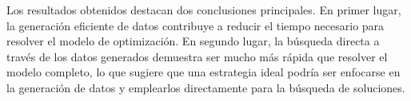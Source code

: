 \documentclass[12pt]{report}
\begin{document}
Los resultados obtenidos destacan dos conclusiones principales. En primer lugar, la generación eficiente de datos contribuye a reducir el tiempo necesario para resolver el modelo de optimización. En segundo lugar, la búsqueda directa a través de los datos generados demuestra ser mucho más rápida que resolver el modelo completo, lo que sugiere que una estrategia ideal podría ser enfocarse en la generación de datos y emplearlos directamente para la búsqueda de soluciones.



\end{document}
